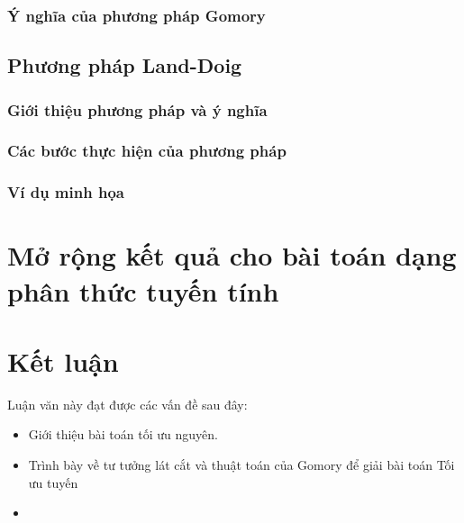 \documentclass[12pt,a4paper]{report}
\begin{document}
\subsection{Ý nghĩa của phương pháp Gomory}

\section{Phương pháp Land-Doig}

\subsection{Giới thiệu phương pháp và ý nghĩa}

\subsection{Các bước thực hiện của phương pháp}

\subsection{Ví dụ minh họa}

\chapter{Mở rộng kết quả cho bài toán dạng phân thức tuyến tính}


\chapter*{Kết luận}                         %
\indent
\thispagestyle{fancy}

Luận văn này đạt được các vấn đề sau đây:

\begin{itemize}
	\item  Giới thiệu bài toán tối ưu nguyên.
	\item  Trình bày về tư tưởng lát cắt và thuật toán của Gomory để giải bài toán Tối ưu tuyến 
	\item
\end{itemize}
\end{document}

